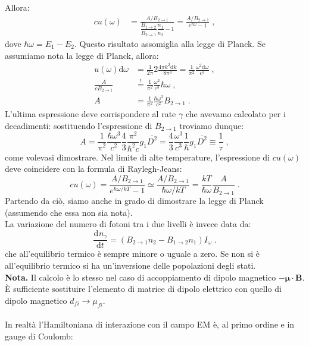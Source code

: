 \documentclass[10pt,a4paper]{report}
\theoremstyle{definition}
\newcommand{\dev}[3][]{\frac{\mathrm{d}^{#1} #2}{\mathrm{d} #3^{#1}}}
\numberwithin{equation}{section}
\newcommand{\diff}[1][]{\mathrm{d}#1}
\begin{document}
Allora:
\begin{align}
cu(\omega) &= \frac{A/B_{2\to 1}}{\dfrac{B_{1\to 2}}{B_{2\to 1}}\dfrac{n_1}{n_2}-1}=\frac{A/B_{2\to 1}}{e^{\hbar\omega}-1}\;,
\end{align}
dove $\hbar\omega= E_1-E_2$. Questo risultato assomiglia alla legge di Planck. Se assumiamo nota la legge di Planck, allora:
\begin{align*}
u(\omega)\diff{\omega}&=\frac{1}{2\pi}2\frac{4\pi k^2\diff{k}}{8\pi^3}=\frac{1}{\pi^2}\frac{\omega^2\diff{\omega}}{c^3}\;,  \\
\frac{A}{cB_{2\to 1}}&\stackrel{!}{=}\frac{1}{\pi^2}\frac{\omega^2}{c^3}\hbar\omega\;, \\
A&= \frac{1}{\pi^2}\frac{\hbar\omega^3}{c^2}B_{2\to 1}\;.
\end{align*}
L'ultima espressione deve corrispondere al rate $\gamma$ che avevamo calcolato per i decadimenti: sostituendo l'espressione di $B_{2\to 1}$  troviamo dunque:
\begin{equation}
A=\frac{1}{\pi^2}\frac{\hbar\omega^3}{c^2}\frac{4}{3}\frac{\pi^2}{\hbar^2c}g_1\overline{D^2}=\frac{4}{3}\frac{\omega^3}{c^3}\frac{1}{\hbar}g_1\overline{D^2}\equiv \frac{1}{\tau}\;,
\end{equation}
come volevasi dimostrare. Nel limite di alte temperature, l'espressione di $cu(\omega)$ deve coincidere con la formula di Raylegh-Jeans:
\begin{equation}
cu(\omega)=\frac{A/B_{2\to 1}}{e^{\hbar\omega/kT}-1}\simeq \frac{A/B_{2\to 1}}{\hbar\omega/kT}=\frac{kT}{\hbar\omega}\frac{A}{B_{2\to 1}}\;.
\end{equation}
Partendo da ciò, siamo anche in grado di dimostrare la legge di Planck (assumendo che essa non sia nota). \\
La variazione del numero di fotoni tra i due livelli è invece data da:
\begin{equation}
\dev{n_{\gamma}}{t}=(B_{2\to 1}n_2-B_{1\to 2}n_1)I_{\omega}\;.
\end{equation}
che all'equilibrio termico è sempre minore o uguale a zero. Se non si è all'equilibrio termico si ha un'inversione delle popolazioni degli stati. \\
\textbf{Nota.} Il calcolo è lo stesso nel caso di accoppiamento di dipolo magnetico $-\boldsymbol{\mu}\cdot\mathbf{B}$. È sufficiente sostituire l'elemento di matrice di dipolo elettrico con quello di dipolo magnetico $d_{fi}\to \mu_{fi}$. \\
\\
In realtà l'Hamiltoniana di interazione con il campo EM è, al primo ordine e in gauge di Coulomb:
\end{document}
